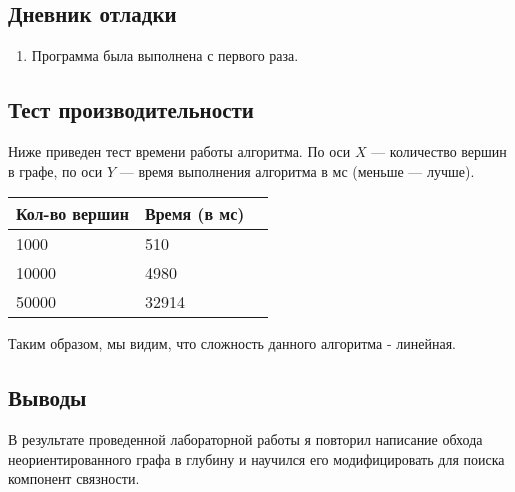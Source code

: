 \documentclass[12pt]{article}
\begin{document}
    \subsection*{Дневник отладки}

    \begin{enumerate}
    \item Программа была выполнена с первого раза.
    \end{enumerate}

    \subsection*{Тест производительности}

    Ниже приведен тест времени работы алгоритма. По оси $X$ — количество 
    вершин в графе, по оси $Y$ — время выполнения алгоритма в мс (меньше 
    — лучше).
    

    \begin{tabular}{ | l | l | l | }
        \hline
            Кол-во вершин    & Время (в мс) \\ \hline
            1000             & 510           \\
            10000            & 4980          \\
            50000           & 32914         \\
        \hline
    \end{tabular}

    Таким образом, мы видим, что сложность данного алгоритма - линейная.

    \subsection*{Выводы}

    В результате проведенной лабораторной работы я повторил написание обхода неориентированного графа в глубину и 
    научился его модифицировать для поиска компонент связности.
\end{document}
